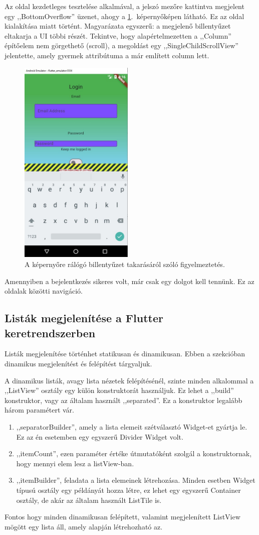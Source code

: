\documentclass{thesis-ekf}
\theoremstyle{definition}
\theoremstyle{remark}
\begin{document}
	Az oldal kezdetleges tesztelése alkalmával, a jelszó mezőre kattintva megjelent egy ,,BottomOverflow'' üzenet, ahogy a \ref{img_login}.~képernyőképen látható. Ez az oldal kialakítása miatt történt. Magyarázata egyszerű: a megjelenő billentyűzet eltakarja a UI többi részét. Tekintve, hogy alapértelmezetten a ,,Column'' építőelem nem görgethető (scroll), a megoldást egy ,,SingleChildScrollView'' jelentette, amely gyermek attribútuma a már említett column lett.
	\begin{figure}[!h]
		\centering
		\includegraphics[height=10cm]{flutter_overflow}
		\caption{A képernyőre rálógó billentyűzet takarásáról szóló figyelmeztetés.}
		\label{img_login}
	\end{figure}
	
	Amennyiben a bejelentkezés sikeres volt, már csak egy dolgot kell tennünk. Ez az oldalak közötti navigáció.
	\subsection{Listák megjelenítése a Flutter keretrendszerben}
	Listák megjelenítése történhet statikusan és dinamikusan. Ebben a szekcióban dinamikus megjelenítést és felépítést tárgyaljuk.
	
	A dinamikus listák, avagy lista nézetek felépítésénél, szinte minden alkalommal a ,,ListView'' osztály egy külön konstruktorát használjuk. Ez lehet a ,,build'' konstruktor, vagy az általam használt ,,separated''. Ez a konstruktor legalább három paramétert vár.
	\begin{enumerate}
		\item ,,separatorBuilder'', amely a lista elemeit szétválasztó Widget-et gyártja le. Ez az én esetemben egy egyszerű Divider Widget volt.
		\item ,,itemCount'', ezen paraméter értéke útmutatóként szolgál a konstruktornak, hogy mennyi elem lesz a listView-ban.
		\item ,,itemBuilder'', feladata a lista elemeinek létrehozása. Minden esetben Widget típusú osztály egy példányát hozza létre, ez lehet egy egyszerű Container osztály, de akár az általam használt ListTile is.
	\end{enumerate}
	Fontos hogy minden dinamikusan felépített, valamint megjelenített ListView mögött egy lista áll, amely alapján létrehozható az.
\end{document}
